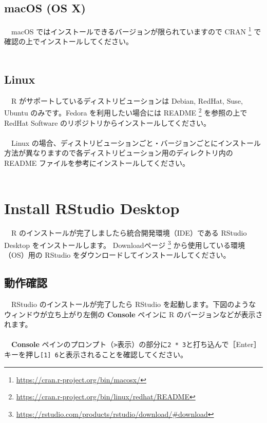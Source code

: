 \documentclass[
  12pt,
]{book}
\DeclareRobustCommand{\href}[2]{#2\footnote{\url{#1}}}
\begin{document}
\hypertarget{macos-os-x}{%
\subsection{macOS (OS X)}\label{macos-os-x}}

　macOS ではインストールできるバージョンが限られていますので \href{https://cran.r-project.org/bin/macosx/}{CRAN } で確認の上でインストールしてください。\\
　

\hypertarget{linux}{%
\subsection{Linux}\label{linux}}

　R がサポートしているディストリビューションは Debian, RedHat, Suse, Ubuntu のみです。Fedora を利用したい場合には \href{https://cran.r-project.org/bin/linux/redhat/README}{README } を参照の上で RedHat Software のリポジトリからインストールしてください。\\
　\\
　Linux の場合、ディストリビューションごと・バージョンごとにインストール方法が異なりますので各ディストリビューション用のディレクトリ内の README ファイルを参考にインストールしてください。\\
　

\hypertarget{install-rstudio-desktop}{%
\section{Install RStudio Desktop}\label{install-rstudio-desktop}}

　R のインストールが完了しましたら統合開発環境（IDE）である RStudio Desktop をインストールします。 \href{https://rstudio.com/products/rstudio/download/\#download}{Downloadページ } から使用している環境（OS）用の RStudio をダウンロードしてインストールしてください。 　

\hypertarget{ux52d5ux4f5cux78baux8a8d}{%
\subsection{動作確認}\label{ux52d5ux4f5cux78baux8a8d}}

　RStudio のインストールが完了したら RStudio を起動します。下図のようなウィンドウが立ち上がり左側の \textbf{Console} ペインに R のバージョンなどが表示されます。\\
　\\

　\textbf{Console} ペインのプロンプト（\texttt{\textgreater{}}表示）の部分に\texttt{2\ *\ 3}と打ち込んで［Enter］キーを押し\texttt{{[}1{]}\ 6}と表示されることを確認してください。
\end{document}
